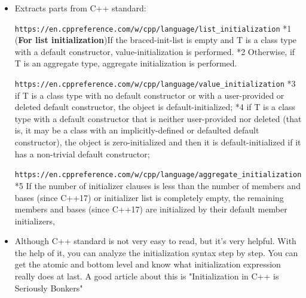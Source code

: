 \documentclass[a4paper,11pt,twoside]{book}
\begin{document}
\begin{itemize}
	\item  Extracts parts from C++ standard: 
	
	
		\verb|https://en.cppreference.com/w/cpp/language/list_initialization| \newline
		*1 (\textbf{For list initialization})If the braced-init-list is empty and T is a class type with a default constructor, value-initialization is performed. 
		\newline
		*2 Otherwise, if T is an aggregate type, aggregate initialization is performed.

		
		\verb|https://en.cppreference.com/w/cpp/language/value_initialization|	\newline
		*3 if T is a class type with no default constructor or with a user-provided or deleted default constructor, the object is default-initialized; 
		\newline		
		*4 if T is a class type with a default constructor that is neither user-provided nor deleted (that is, it may be a class with an implicitly-defined or defaulted default constructor), the object is zero-initialized and then it is default-initialized if it has a non-trivial default constructor; 
		
		\verb|https://en.cppreference.com/w/cpp/language/aggregate_initialization|\newline
		*5 If the number of initializer clauses is less than the number of members and bases (since C++17) or initializer list is completely empty, the remaining members and bases (since C++17) are initialized by their default member initializers,

	
	\item Although C++ standard is not very easy to read, but it's very helpful. With the help of it, you can analyze the initialization syntax step by step. You can get the atomic and bottom level and know what initialization expression really does at last. A good article about this is "Initialization in C++ is Seriously Bonkers"
	
\end{itemize}
\end{document}
